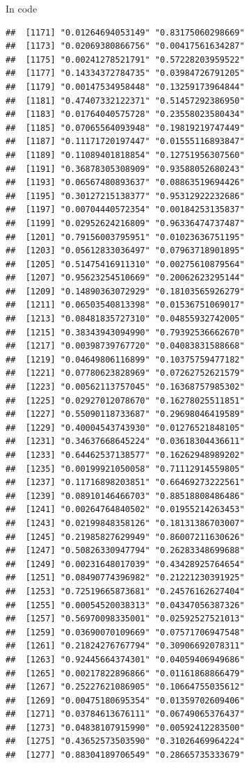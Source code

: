 \documentclass[ignorenonframetext,]{beamer}
\begin{document}
\begin{frame}[fragile]{In code}
\begin{verbatim}
##  [1171] "0.01264694053149" "0.83175060298669"
##  [1173] "0.02069380866756" "0.00417561634287"
##  [1175] "0.00241278521791" "0.57228203959522"
##  [1177] "0.14334372784735" "0.03984726791205"
##  [1179] "0.00147534958448" "0.13259173964844"
##  [1181] "0.47407332122371" "0.51457292386950"
##  [1183] "0.01764040575728" "0.23558023580434"
##  [1185] "0.07065564093948" "0.19819219747449"
##  [1187] "0.11171720197447" "0.01555116893847"
##  [1189] "0.11089401818854" "0.12751956307560"
##  [1191] "0.36878305308909" "0.93588052680243"
##  [1193] "0.06567480893637" "0.08863519694426"
##  [1195] "0.30127215138377" "0.95312922232686"
##  [1197] "0.00704440572354" "0.00184253135837"
##  [1199] "0.02952624216809" "0.96336474737487"
##  [1201] "0.79156003795951" "0.01023636751195"
##  [1203] "0.05612833036497" "0.07963718901895"
##  [1205] "0.51475416911310" "0.00275610879564"
##  [1207] "0.95623254510669" "0.20062623295144"
##  [1209] "0.14890363072929" "0.18103565926279"
##  [1211] "0.06503540813398" "0.01536751069017"
##  [1213] "0.08481835727310" "0.04855932742005"
##  [1215] "0.38343943094990" "0.79392536662670"
##  [1217] "0.00398739767720" "0.04083831588668"
##  [1219] "0.04649806116899" "0.10375759477182"
##  [1221] "0.07780623828969" "0.07262752621579"
##  [1223] "0.00562113757045" "0.16368757985302"
##  [1225] "0.02927012078670" "0.16278025511851"
##  [1227] "0.55090118733687" "0.29698046419589"
##  [1229] "0.40004543743930" "0.01276521848105"
##  [1231] "0.34637668645224" "0.03618304436611"
##  [1233] "0.64462537138577" "0.16262948989202"
##  [1235] "0.00199921050058" "0.71112914559805"
##  [1237] "0.11716898203851" "0.66469273222561"
##  [1239] "0.08910146466703" "0.88518808486486"
##  [1241] "0.00264764840502" "0.01955214263453"
##  [1243] "0.02199848358126" "0.18131386703007"
##  [1245] "0.21985827629949" "0.86007211630626"
##  [1247] "0.50826330947794" "0.26283348699688"
##  [1249] "0.00231648017039" "0.43428925764654"
##  [1251] "0.08490774396982" "0.21221230391925"
##  [1253] "0.72519665873681" "0.24576162627404"
##  [1255] "0.00054520038313" "0.04347056387326"
##  [1257] "0.56970098335001" "0.02592527521013"
##  [1259] "0.03690070109669" "0.07571706947548"
##  [1261] "0.21824276767794" "0.30906692078311"
##  [1263] "0.92445664374301" "0.04059406949686"
##  [1265] "0.00217822896866" "0.01161868866479"
##  [1267] "0.25227621086905" "0.10664755035612"
##  [1269] "0.00475180695354" "0.01359702609406"
##  [1271] "0.03784613676111" "0.06749065376437"
##  [1273] "0.04838107915990" "0.00592412283500"
##  [1275] "0.43652573503590" "0.31026469964224"
##  [1277] "0.88304189706549" "0.28665735333679"

\end{verbatim}
\end{frame}
\end{document}
